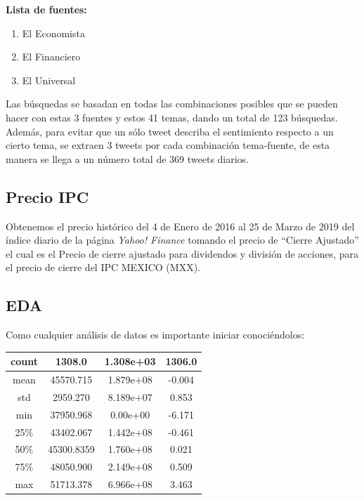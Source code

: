 \documentclass[12pt,reqno,letter]{article}
\begin{document}
\begin{multicols}{2}
        \textbf{Lista de fuentes:}
        \begin{enumerate}
        \item El Economista
        \item El Financiero
        \item El Universal
        \end{enumerate}
        
        
        Las búsquedas se basadan en todas las combinaciones posibles que se pueden hacer con estas 3 fuentes y estos 41 temas, dando un total de 123 búsquedas. Además, para evitar que un sólo tweet describa el sentimiento respecto a un cierto tema, se extraen 3 tweets por cada combinación tema-fuente, de esta manera se llega a un número total de 369 tweets diarios.


\subsection{Precio IPC}
	    Obtenemos el precio histórico del 4 de Enero de 2016 al 25 de Marzo de 2019 del índice diario de la página \textit{Yahoo! Finance} tomando el precio de ``Cierre Ajustado'' el cual es el Precio de cierre ajustado para dividendos y división de acciones, para el precio de cierre del IPC MEXICO (MXX). 
	    

        \subsection{EDA}
        
        Como cualquier análisis de datos es importante iniciar conociéndolos:
        \begin{center}
        \begin{tabular}{ |c|c|c|c| } 
         \hline
         count  & 1308.0 & 1.308e+03 & 1306.0 \\
         \hline
         mean &  45570.715 & 1.879e+08    & -0.004 \\
             \hline
            std &    2959.270  & 8.189e+07     & 0.853 \\
             \hline
            min  &  37950.968 &  0.00e+00 &    -6.171 \\
             \hline
            25\%  &  43402.067 &  1.442e+08 &   -0.461 \\
             \hline
            50\%    & 45300.8359  & 1.760e+08    & 0.021 \\
             \hline
            75\%    & 48050.900 &  2.149e+08 &     0.509 \\
             \hline
            max &   51713.378 & 6.966e+08   &  3.463 \\
             \hline
         \hline
        \end{tabular}
        \end{center}
        

\end{multicols}
\end{document}
